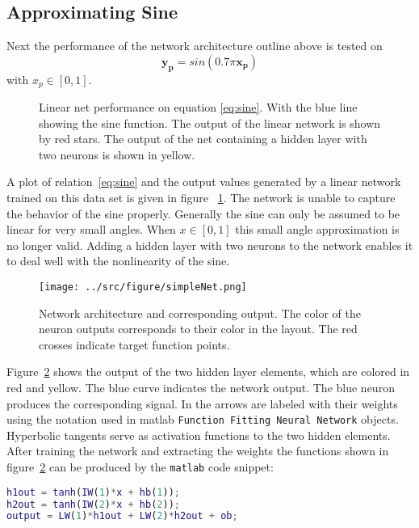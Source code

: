 \subsection{Approximating Sine}
Next the performance of the network architecture outline above is tested on
\begin{equation}
\mathbf{y_p} = sin(0.7\pi\mathbf{x_p})
\label{eq:sine}
\end{equation}
with $x_p \in [0,1]$.
\begin{figure}
\centering

\caption{Linear net performance on equation \ref{eq:sine}. With the blue line showing the sine function. The output of the linear network is shown by red stars. The output of the net containing a hidden layer with two neurons is shown in yellow.}
\label{fig:sineLinNet}
\end{figure}
A plot of relation~\ref{eq:sine} and the output values generated by a linear network trained on this data set is given in figure ~\ref{fig:sineLinNet}. The network is unable to capture the behavior of the sine properly. Generally the sine can only be assumed to be linear for very small angles. When $x \in [0,1]$ this small angle approximation is no longer valid. Adding a hidden layer with two neurons to the network enables it to deal well with the nonlinearity of the sine. 
\begin{figure}
\centering
\texttt{[image: ../src/figure/simpleNet.png]}

\caption{Network architecture and corresponding output. The color of the neuron outputs corresponds to their color in the layout. The red crosses indicate target function points.}
\label{fig:layoutOutput}
\end{figure}

Figure~\ref{fig:layoutOutput} shows the output of the two hidden layer elements, which are colored in red and yellow. The blue curve indicates the network output. The blue neuron produces the corresponding signal. In the arrows are labeled with their weights using the notation used in matlab \texttt{Function Fitting Neural Network} objects. Hyperbolic tangents serve as activation functions to the two hidden elements. After training the network and extracting the weights the functions shown in figure~\ref{fig:layoutOutput} can be produced by the \texttt{matlab} code snippet:
\begin{lstlisting}[language=matlab]
h1out = tanh(IW(1)*x + hb(1));
h2out = tanh(IW(2)*x + hb(2));
output = LW(1)*h1out + LW(2)*h2out + ob;
\end{lstlisting}

